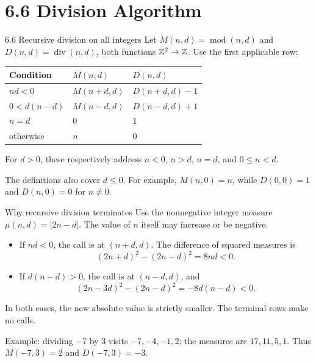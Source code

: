 \section{6.6 Division Algorithm}
\begin{frame}{6.6 Recursive division on all integers}
Let $M(n,d)=\operatorname{mod}(n,d)$ and
$D(n,d)=\operatorname{div}(n,d)$, both functions $\mathbb{Z}^2\to\mathbb{Z}$.
Use the first applicable row:
\begin{center}
\begin{tabular}{lll}
\toprule
Condition & $M(n,d)$ & $D(n,d)$\\
\midrule
$nd<0$ & $M(n+d,d)$ & $D(n+d,d)-1$\\
$0<d(n-d)$ & $M(n-d,d)$ & $D(n-d,d)+1$\\
$n=d$ & $0$ & $1$\\
otherwise & $n$ & $0$\\
\bottomrule
\end{tabular}
\end{center}
For $d>0$, these respectively address $n<0$, $n>d$, $n=d$, and $0\le n<d$.

The definitions also cover $d\le0$. For example,
$M(n,0)=n$, while $D(0,0)=1$ and $D(n,0)=0$ for $n\ne0$.
\end{frame}

\begin{frame}{Why recursive division terminates}
Use the nonnegative integer measure $\mu(n,d)=|2n-d|$.
The value of $n$ itself may increase or be negative.
\begin{itemize}
\item If $nd<0$, the call is at $(n+d,d)$. The difference of squared measures is
\[
 (2n+d)^2-(2n-d)^2=8nd<0.
\]
\item If $d(n-d)>0$, the call is at $(n-d,d)$, and
\[
 (2n-3d)^2-(2n-d)^2=-8d(n-d)<0.
\]
\end{itemize}
In both cases, the new absolute value is strictly smaller.
The terminal rows make no calls.

Example: dividing $-7$ by $3$ visits $-7,-4,-1,2$;
the measures are $17,11,5,1$. Thus $M(-7,3)=2$ and $D(-7,3)=-3$.
\end{frame}

